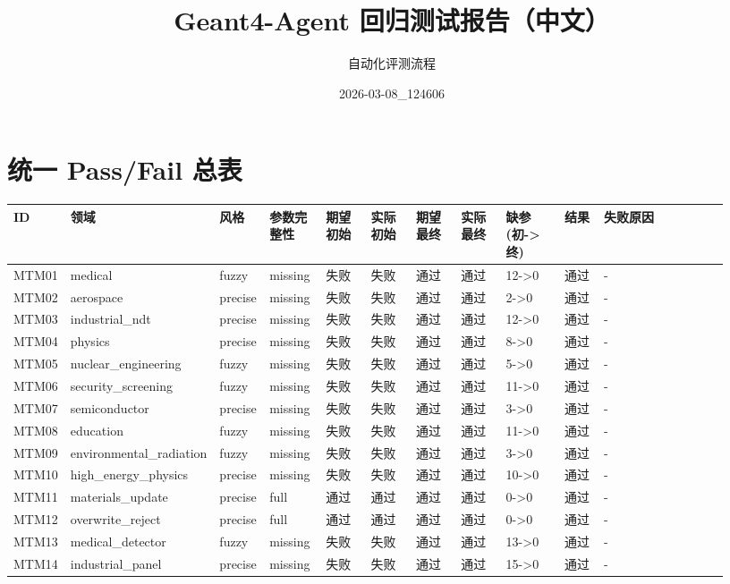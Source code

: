 \documentclass[11pt]{ctexart}
\title{Geant4-Agent 回归测试报告（中文）}
\author{自动化评测流程}
\date{2026-03-08\_124606}
\begin{document}
\maketitle
\section{统一 Pass/Fail 总表}
\begin{longtable}{p{0.06\linewidth}p{0.08\linewidth}p{0.07\linewidth}p{0.08\linewidth}p{0.07\linewidth}p{0.07\linewidth}p{0.07\linewidth}p{0.07\linewidth}p{0.09\linewidth}p{0.06\linewidth}p{0.21\linewidth}}
\toprule
ID & 领域 & 风格 & 参数完整性 & 期望初始 & 实际初始 & 期望最终 & 实际最终 & 缺参(初->终) & 结果 & 失败原因 \\
\midrule
MTM01 & medical & fuzzy & missing & 失败 & 失败 & 通过 & 通过 & 12->0 & 通过 & - \\
MTM02 & aerospace & precise & missing & 失败 & 失败 & 通过 & 通过 & 2->0 & 通过 & - \\
MTM03 & industrial\_ndt & precise & missing & 失败 & 失败 & 通过 & 通过 & 12->0 & 通过 & - \\
MTM04 & physics & precise & missing & 失败 & 失败 & 通过 & 通过 & 8->0 & 通过 & - \\
MTM05 & nuclear\_engineering & fuzzy & missing & 失败 & 失败 & 通过 & 通过 & 5->0 & 通过 & - \\
MTM06 & security\_screening & fuzzy & missing & 失败 & 失败 & 通过 & 通过 & 11->0 & 通过 & - \\
MTM07 & semiconductor & precise & missing & 失败 & 失败 & 通过 & 通过 & 3->0 & 通过 & - \\
MTM08 & education & fuzzy & missing & 失败 & 失败 & 通过 & 通过 & 11->0 & 通过 & - \\
MTM09 & environmental\_radiation & fuzzy & missing & 失败 & 失败 & 通过 & 通过 & 3->0 & 通过 & - \\
MTM10 & high\_energy\_physics & precise & missing & 失败 & 失败 & 通过 & 通过 & 10->0 & 通过 & - \\
MTM11 & materials\_update & precise & full & 通过 & 通过 & 通过 & 通过 & 0->0 & 通过 & - \\
MTM12 & overwrite\_reject & precise & full & 通过 & 通过 & 通过 & 通过 & 0->0 & 通过 & - \\
MTM13 & medical\_detector & fuzzy & missing & 失败 & 失败 & 通过 & 通过 & 13->0 & 通过 & - \\
MTM14 & industrial\_panel & precise & missing & 失败 & 失败 & 通过 & 通过 & 15->0 & 通过 & - \\

\end{longtable}
\end{document}
